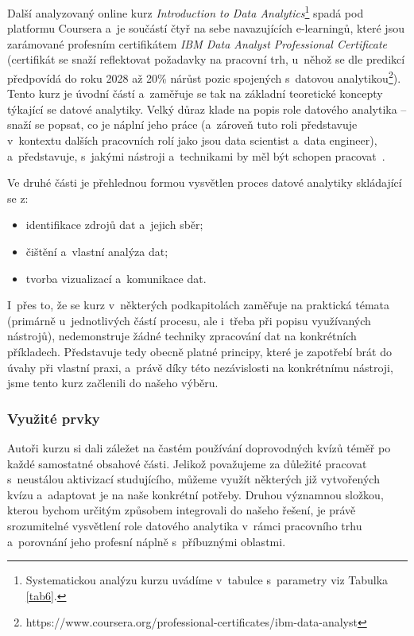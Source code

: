 Další analyzovaný online kurz \emph{Introduction to Data Analytics}\footnote{Systematickou analýzu kurzu uvádíme v~tabulce s~parametry viz Tabulka \ref{tab6}.} spadá pod platformu Coursera a~je součástí čtyř na sebe navazujících e-learningů, které jsou zarámované profesním certifikátem \emph{IBM Data Analyst Professional Certificate} (certifikát se snaží reflektovat požadavky na pracovní trh, u~něhož se dle predikcí předpovídá do roku 2028 až 20\% nárůst pozic spojených s~datovou analytikou\footnote{https://www.coursera.org/professional-certificates/ibm-data-analyst}). Tento kurz je úvodní částí a~zaměřuje se tak na základní teoretické koncepty týkající se datové analytiky. Velký důraz klade na popis role datového analytika -- snaží se popsat, co je náplní jeho práce (a~zároveň tuto roli představuje v~kontextu dalších pracovních rolí jako jsou data scientist a~data engineer), a~představuje, s~jakými nástroji a~technikami by měl být schopen pracovat~\parencite{course6}.

Ve druhé části je přehlednou formou vysvětlen proces datové analytiky skládající se z:

\begin{itemize}
\tightlist
\item
  identifikace zdrojů dat a~jejich sběr;
\item
  čištění a~vlastní analýza dat;
\item
  tvorba vizualizací a~komunikace dat.
\end{itemize}

I~přes to, že se kurz v~některých podkapitolách zaměřuje na praktická témata (primárně u~jednotlivých částí procesu, ale i~třeba při popisu využívaných nástrojů), nedemonstruje žádné techniky zpracování dat na konkrétních příkladech. Představuje tedy obecně platné principy, které je zapotřebí brát do úvahy při vlastní praxi, a~právě díky této nezávislosti na konkrétnímu nástroji, jsme tento kurz začlenili do našeho výběru.

\hypertarget{vyuux17eituxe9-prvky-5}{%
\subsubsection{Využité prvky}\label{vyuux17eituxe9-prvky-5}}

Autoři kurzu si dali záležet na častém používání doprovodných kvízů téměř po každé samostatné obsahové části. Jelikož považujeme za důležité pracovat s~neustálou aktivizací studujícího, můžeme využít některých již vytvořených kvízu a~adaptovat je na naše konkrétní potřeby. Druhou významnou složkou, kterou bychom určitým způsobem integrovali do našeho řešení, je právě srozumitelné vysvětlení role datového analytika v~rámci pracovního trhu a~porovnání jeho profesní náplně s~příbuznými oblastmi.

